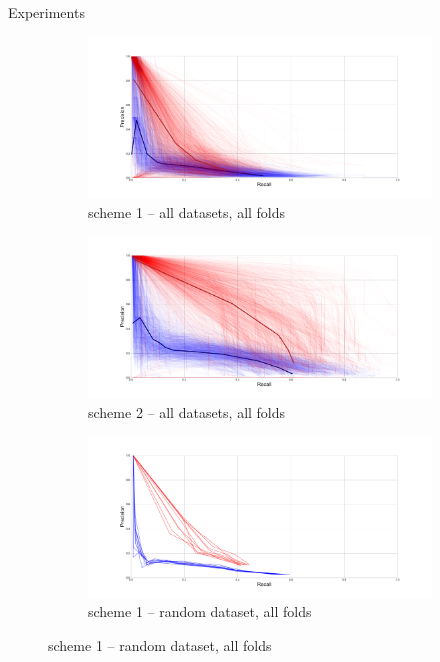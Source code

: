 \documentclass[svgnames,final]{beamer}
\begin{document}
\begin{frame}
\begin{columns}[T]
\begin{column}{.3\linewidth}
\begin{block}{Experiments}
		\begin{figure}[h]
		\centering
		\begin{subfigure}{.5\textwidth}
		  \centering
		  \includegraphics[width=\linewidth]{images/2.pdf}
		  \caption{scheme 1 -- all datasets, all folds}
		  \label{fig:sub1}
		\end{subfigure}%
		\begin{subfigure}{.5\textwidth}
		  \centering
		  \includegraphics[width=\linewidth]{images/1.pdf}
		  \caption{scheme 2 -- all datasets, all folds}
		  \label{fig:sub2}
		\end{subfigure}
		\begin{subfigure}{.5\textwidth}
		  \centering
		  \includegraphics[width=\linewidth]{images/4.pdf}
		  \caption{scheme 1 -- random dataset, all folds}

\end{subfigure}
\end{figure}
\end{block}
\end{column}
\end{columns}
\end{frame}
\end{document}
